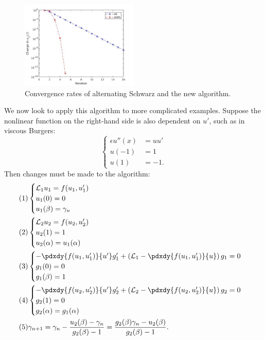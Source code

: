 \documentclass{book}
\begin{document}
\begin{figure}
\centering
	\includegraphics[width=0.5\textwidth]{ASPN01.jpg}
	\caption{Convergence rates of alternating Schwarz and the new algorithm.}
	\label{fig:ASPN01}
\end{figure}

We now look to apply this algorithm to more complicated examples.
Suppose the nonlinear function on the right-hand side is also dependent on $u'$, such as in viscous Burgers:
\begin{equation*}
\begin{cases} \epsilon u''(x) & = u u' \\
u(-1) & = 1 \\
u(1) & = -1 . \end{cases}
\end{equation*}
Then changes must be made to the algorithm:
\begin{align*}
(1) & \begin{cases} \mathcal{L}_1 u_1 = f(u_1,u'_1) \\ u_1(0) = 0 \\ u_1(\beta) = \gamma_n \end{cases} \\
(2) & \begin{cases} \mathcal{L}_2 u_2 = f(u_2,u_2') \\ u_2(1) = 1 \\ u_2(\alpha) = u_1(\alpha) \end{cases} \\
(3) & \begin{cases} -\pdxdy{f(u_1,u_1')}{u'} g_1' + \left ( \mathcal{L}_1 - \pdxdy{f(u_1,u_1')}{u} \right ) g_1 = 0 \\
g_1(0) = 0 \\ g_1(\beta) = 1 \end{cases} \\
(4) & \begin{cases} -\pdxdy{f(u_2,u_2')}{u'} g_2' + \left ( \mathcal{L}_2 - \pdxdy{f(u_2,u_2')}{u} \right ) g_2 = 0 \\
g_2(1) = 0 \\ g_2(\alpha) = g_1(\alpha) \end{cases} \\
(5) & \gamma_{n+1} = \gamma_n - \frac{ u_2(\beta) - \gamma_n }{g_2(\beta) - 1} = \frac{ g_2(\beta) \gamma_n - u_2(\beta)}{g_2(\beta) - 1} .
\end{align*}
\end{document}

